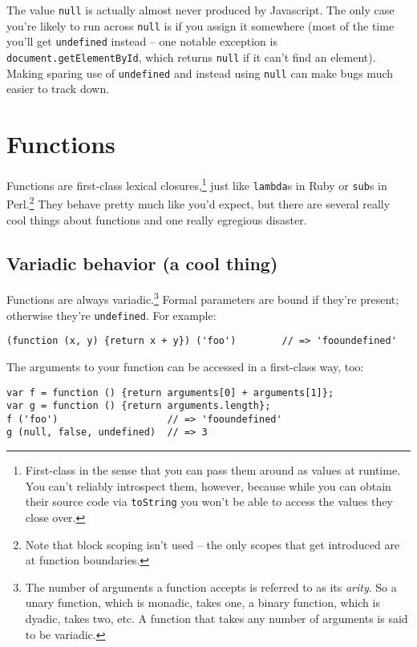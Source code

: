 \documentclass{article}
\begin{document}
  The value \verb|null| is actually almost never produced by Javascript. The only case you're likely to run across \verb|null| is if you assign it somewhere (most of the time you'll get
  \verb|undefined| instead -- one notable exception is \verb|document.getElementById|, which returns \verb|null| if it can't find an element). Making sparing use of \verb|undefined| and
  instead using \verb|null| can make bugs much easier to track down.

\section {Functions}
  Functions are first-class lexical closures,\footnote{First-class in the sense that you can pass them around as values at runtime. You can't reliably introspect them, however, because while
  you can obtain their source code via {\tt toString} you won't be able to access the values they close over.} just like \verb|lambda|s in Ruby or \verb|sub|s in Perl.\footnote{Note that block
  scoping isn't used -- the only scopes that get introduced are at function boundaries.} They behave pretty much like you'd expect, but there are several really cool things about functions and
  one really egregious disaster.

\subsection {Variadic behavior (a cool thing)}
    Functions are always variadic.\footnote{The number of arguments a function accepts is referred to as its {\it arity}. So a unary function, which is monadic, takes one, a binary function,
    which is dyadic, takes two, etc. A function that takes any number of arguments is said to be variadic.} Formal parameters are bound if they're present; otherwise they're \verb|undefined|.
    For example:

\begin{verbatim}
(function (x, y) {return x + y}) ('foo')        // => 'fooundefined'
\end{verbatim}

    The arguments to your function can be accessed in a first-class way, too:

\begin{verbatim}
var f = function () {return arguments[0] + arguments[1]};
var g = function () {return arguments.length};
f ('foo')                   // => 'fooundefined'
g (null, false, undefined)  // => 3
\end{verbatim}
\end{document}
